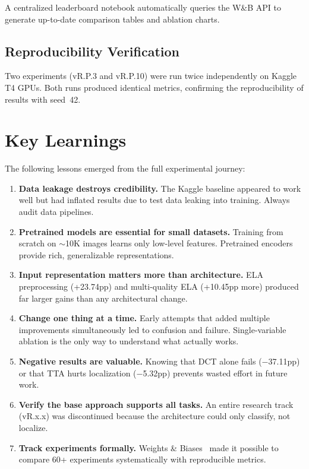 \documentclass[conference]{IEEEtran}
\begin{document}
A centralized leaderboard notebook automatically queries the W\&B API to generate up-to-date comparison tables and ablation charts.

\subsection{Reproducibility Verification}

Two experiments (vR.P.3 and vR.P.10) were run twice independently on Kaggle T4 GPUs. Both runs produced identical metrics, confirming the reproducibility of results with seed~42.


\section{Key Learnings}

The following lessons emerged from the full experimental journey:

\begin{enumerate}
    \item \textbf{Data leakage destroys credibility.} The Kaggle baseline appeared to work well but had inflated results due to test data leaking into training. Always audit data pipelines.

    \item \textbf{Pretrained models are essential for small datasets.} Training from scratch on $\sim$10K images learns only low-level features. Pretrained encoders provide rich, generalizable representations.

    \item \textbf{Input representation matters more than architecture.} ELA preprocessing (+23.74pp) and multi-quality ELA (+10.45pp more) produced far larger gains than any architectural change.

    \item \textbf{Change one thing at a time.} Early attempts that added multiple improvements simultaneously led to confusion and failure. Single-variable ablation is the only way to understand what actually works.

    \item \textbf{Negative results are valuable.} Knowing that DCT alone fails ($-$37.11pp) or that TTA hurts localization ($-$5.32pp) prevents wasted effort in future work.

    \item \textbf{Verify the base approach supports all tasks.} An entire research track (vR.x.x) was discontinued because the architecture could only classify, not localize.

    \item \textbf{Track experiments formally.} Weights \& Biases~\cite{wandb2020} made it possible to compare 60+ experiments systematically with reproducible metrics.
\end{enumerate}
\end{document}
